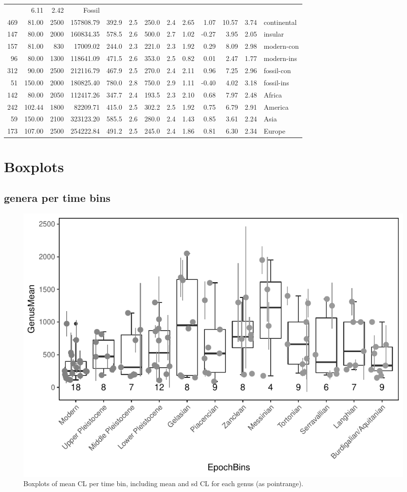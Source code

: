 \documentclass[]{article}
\begin{document}
\begin{longtable}[]{@{}rrrrrrrrrrrrl@{}}
& 6.11 & 2.42 & Fossil\tabularnewline
469 & 81.00 & 2500 & 157808.79 & 392.9 & 2.5 & 250.0 & 2.4 & 2.65 & 1.07
& 10.57 & 3.74 & continental\tabularnewline
147 & 80.00 & 2000 & 160834.35 & 578.5 & 2.6 & 500.0 & 2.7 & 1.02 &
-0.27 & 3.95 & 2.05 & insular\tabularnewline
157 & 81.00 & 830 & 17009.02 & 244.0 & 2.3 & 221.0 & 2.3 & 1.92 & 0.29 &
8.09 & 2.98 & modern-con\tabularnewline
96 & 80.00 & 1300 & 118641.09 & 471.5 & 2.6 & 353.0 & 2.5 & 0.82 & 0.01
& 2.47 & 1.77 & modern-ins\tabularnewline
312 & 90.00 & 2500 & 212116.79 & 467.9 & 2.5 & 270.0 & 2.4 & 2.11 & 0.96
& 7.25 & 2.96 & fossil-con\tabularnewline
51 & 150.00 & 2000 & 180825.40 & 780.0 & 2.8 & 750.0 & 2.9 & 1.11 &
-0.40 & 4.02 & 3.18 & fossil-ins\tabularnewline
142 & 80.00 & 2050 & 112417.26 & 347.7 & 2.4 & 193.5 & 2.3 & 2.10 & 0.68
& 7.97 & 2.48 & Africa\tabularnewline
242 & 102.44 & 1800 & 82209.71 & 415.0 & 2.5 & 302.2 & 2.5 & 1.92 & 0.75
& 6.79 & 2.91 & America\tabularnewline
59 & 150.00 & 2100 & 323123.20 & 585.5 & 2.6 & 280.0 & 2.4 & 1.43 & 0.85
& 3.61 & 2.24 & Asia\tabularnewline
173 & 107.00 & 2500 & 254222.84 & 491.2 & 2.5 & 245.0 & 2.4 & 1.86 &
0.81 & 6.30 & 2.34 & Europe\tabularnewline
\bottomrule
\end{longtable}

\newpage

\section{Boxplots}\label{boxplots}

\subsection{genera per time bins}\label{genera-per-time-bins}

\begin{figure}[htbp]
\centering
\includegraphics{MA_JJ_files/figure-latex/BPGBins-1.pdf}
\caption{Boxplots of mean CL per time bin, including mean and sd CL for
each genus (as pointrange).}
\end{figure}
\end{document}
